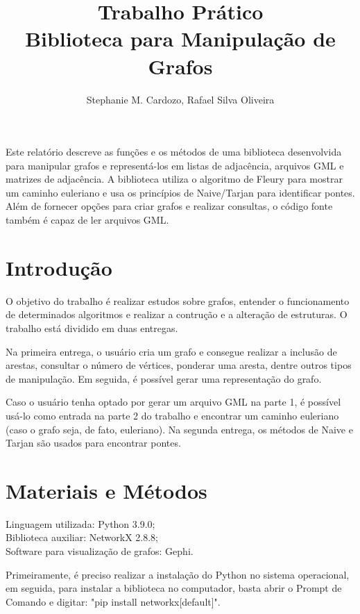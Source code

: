 \documentclass[12pt]{article}
\title{Trabalho Prático\\ Biblioteca para Manipulação de Grafos}
\author{Stephanie M. Cardozo, Rafael Silva Oliveira}
\begin{document}
 

\maketitle

\begin{resumo} 
  Este relatório descreve as funções e os métodos de uma biblioteca desenvolvida para manipular grafos e representá-los em listas de adjacência, arquivos GML e matrizes de adjacência. A biblioteca utiliza o algoritmo de Fleury para mostrar um caminho euleriano e usa os princípios de Naive/Tarjan para identificar pontes. Além de fornecer opções para criar grafos e realizar consultas, o código fonte também é capaz de ler arquivos GML.
\end{resumo}


\section{Introdução} \label{sec:firstpage}

O objetivo do trabalho é realizar estudos sobre grafos, entender o funcionamento de determinados algoritmos e realizar a contrução e a alteração de estruturas. O trabalho está dividido em duas entregas.

Na primeira entrega, o usuário cria um grafo e consegue realizar a inclusão de arestas, consultar o número de vértices, ponderar uma aresta, dentre outros tipos de manipulação. Em seguida, é possível gerar uma representação do grafo.

Caso o usuário tenha optado por gerar um arquivo GML na parte 1, é possível usá-lo como entrada na parte 2 do trabalho e encontrar um caminho euleriano (caso o grafo seja, de fato, euleriano). Na segunda entrega, os métodos de Naive e Tarjan são usados para encontrar pontes.

\section{Materiais e Métodos}

Linguagem utilizada: Python 3.9.0;\\ 
Biblioteca auxiliar: NetworkX 2.8.8;\\
Software para visualização de grafos: Gephi.

Primeiramente, é preciso realizar a instalação do Python no sistema operacional, em seguida, para instalar a biblioteca no computador, basta abrir o Prompt de Comando e digitar: "pip install networkx[default]".
\end{document}

